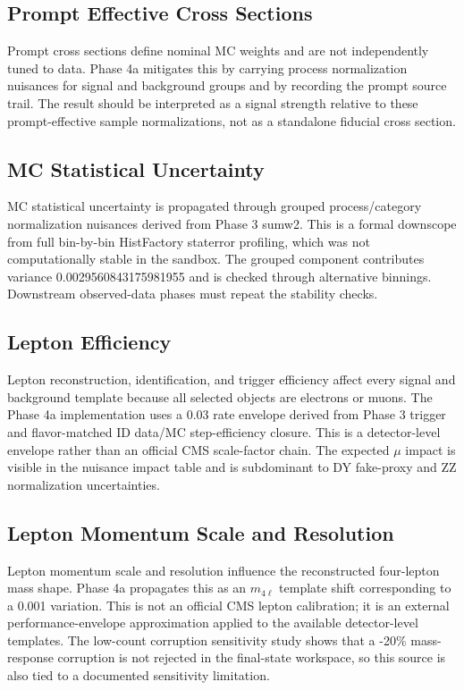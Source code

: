 \documentclass[11pt]{article}
\begin{document}
\subsection{Prompt Effective Cross Sections}
Prompt cross sections define nominal MC weights and are not independently tuned to data. Phase 4a mitigates this by carrying process normalization nuisances for signal and background groups and by recording the prompt source trail. The result should be interpreted as a signal strength relative to these prompt-effective sample normalizations, not as a standalone fiducial cross section.

\subsection{MC Statistical Uncertainty}
MC statistical uncertainty is propagated through grouped process/category normalization nuisances derived from Phase 3 sumw2. This is a formal downscope from full bin-by-bin HistFactory staterror profiling, which was not computationally stable in the sandbox. The grouped component contributes variance 0.0029560843175981955 and is checked through alternative binnings. Downstream observed-data phases must repeat the stability checks.

\subsection{Lepton Efficiency}
Lepton reconstruction, identification, and trigger efficiency affect every signal and background template because all selected objects are electrons or muons. The Phase 4a implementation uses a 0.03 rate envelope derived from Phase 3 trigger and flavor-matched ID data/MC step-efficiency closure. This is a detector-level envelope rather than an official CMS scale-factor chain. The expected $\mu$ impact is visible in the nuisance impact table and is subdominant to DY fake-proxy and ZZ normalization uncertainties.

\subsection{Lepton Momentum Scale and Resolution}
Lepton momentum scale and resolution influence the reconstructed four-lepton mass shape. Phase 4a propagates this as an $m_{4\ell}$ template shift corresponding to a 0.001 variation. This is not an official CMS lepton calibration; it is an external performance-envelope approximation applied to the available detector-level templates. The low-count corruption sensitivity study shows that a -20\% mass-response corruption is not rejected in the final-state workspace, so this source is also tied to a documented sensitivity limitation.
\end{document}
